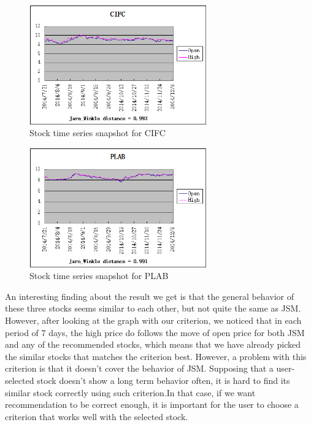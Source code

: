 \documentclass[10pt, conference, compsocconf]{IEEEtran}
\begin{document}
\par
 \begin{figure}[!h]
\vspace{2mm}
\includegraphics[width=3in]{figures/CIFC}
\caption{Stock time series snapshot for CIFC}
\vspace{1mm}
 \end{figure}
\par

\par
\vspace{2mm}
 \begin{figure}[!h]
\includegraphics[width=3in]{figures/PLAB}
\caption{Stock time series snapshot for PLAB}
\vspace{1mm}
\end{figure}
\par

\vspace{1mm}
\par
An interesting finding about the result we get is that the general behavior of these three stocks seems similar to each other, but not quite the same as JSM. However, after looking at the graph with our criterion, we noticed that in each period of 7 days, the high price do follows the move of open price for both JSM and any of the recommended stocks, which means that we have already picked the similar stocks that matches the criterion best. However, a problem with this criterion is that it doesn't cover the behavior of JSM. Supposing that a user-selected stock doesn't show a long term behavior often, it is hard to find its similar stock correctly using such criterion.In that case, if we want recommendation to be correct enough, it is important for the user to choose a criterion that works well with the selected stock.\\ 
\end{document}
